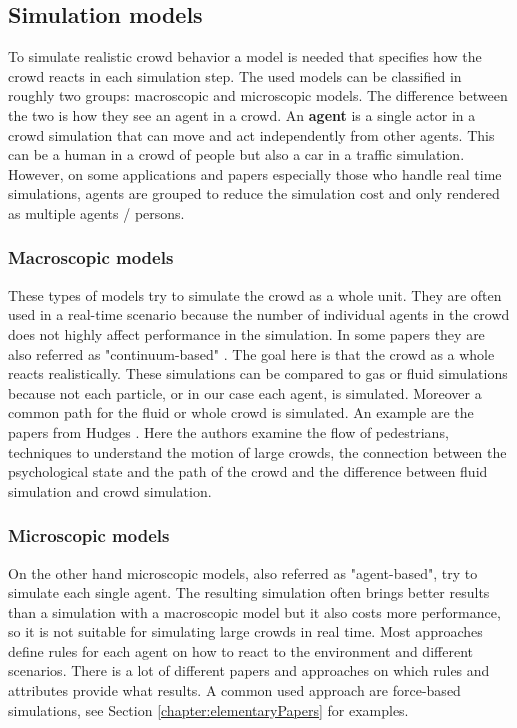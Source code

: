 \documentclass{acmsiggraph}               %
\begin{document}
\subsection{Simulation models}
\label{chap:simulationModels}
To simulate realistic crowd behavior a model is needed that specifies how the crowd reacts in each simulation step. The used models can be classified in roughly two groups: macroscopic and microscopic models. The difference between the two is how they see an agent in a crowd. An \textbf{agent} is a single actor in a crowd simulation that can move and act independently from other agents. This can be a human in a crowd of people but also a car in a traffic simulation. However, on some applications and papers especially those who handle real time simulations, agents are grouped to reduce the simulation cost and only rendered as multiple agents / persons.

\subsubsection{\textbf{Macroscopic models}}
These types of models try to simulate the crowd as a whole unit. They are often used in a real-time scenario because the number of individual agents in the crowd does not highly affect performance in the simulation. In some papers they are also referred as "continuum-based" \cite{xu_crowd_2014}. The goal here is that the crowd as a whole reacts realistically. These simulations can be compared to gas or fluid simulations because not each particle, or in our case each agent, is simulated. Moreover a common path for the fluid or whole crowd is simulated. An example are the papers from Hudges  . Here the authors examine the flow of pedestrians, techniques to understand the motion of large crowds, the connection between the psychological state and the path of the crowd and the difference between fluid simulation and crowd simulation.     

\subsubsection{\textbf{Microscopic models}} \label{def:microscopic models}
On the other hand microscopic models, also referred as "agent-based"\cite{xu_crowd_2014}, try to simulate each single agent. The resulting simulation often brings better results than a simulation with a macroscopic model but it also costs more performance, so it is not suitable for simulating large crowds in real time. Most approaches define rules for each agent on how to react to the environment and different scenarios. There is a lot of different papers and approaches on which rules and attributes provide what results. A common used approach are force-based simulations, see Section \ref{chapter:elementaryPapers} for examples.
\end{document}

